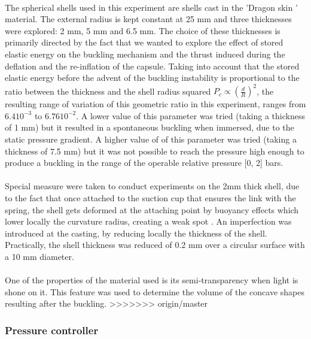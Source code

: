 \paragraph{}
The spherical shells used in this experiment are shells cast in the 'Dragon skin ' material. The external radius is kept constant at 25 mm and three thicknesses were explored: 2 mm, 5 mm and 6.5 mm.
The choice of these thicknesses is primarily directed by the fact that we wanted to explore the effect of stored elastic energy on the buckling mechanism and the thrust induced during the deflation and the re-inflation of the capsule. Taking into account that the stored elastic energy before the advent of the buckling instability is proportional to the ratio between the thickness and the shell radius squared \cite{cqpcritic2011} $P_c \propto (\frac{d}{R})^2$, the resulting range of variation of this geometric ratio in this experiment, ranges from $6.4 10^{-3}$ to $6.76 10^{-2}$.
A lower value of this parameter was tried (taking a thickness of 1 mm) but it resulted in a spontaneous buckling when immersed, due to the static pressure gradient.
A higher value of of this parameter was tried (taking a thickness of 7.5 mm) but it was not possible to reach the pressure high enough to produce a buckling in the range of the operable relative pressure [0, 2] bars.
\paragraph{}
Special measure were taken to conduct experiments on the 2mm thick shell, due to the fact that once attached to the suction cup that ensures the link with the spring, the shell gets deformed at the attaching point by buoyancy effects which lower locally the curvature radius, creating a weak spot \cite{cqpcritic2011}. An imperfection was introduced at the casting, by reducing locally the thickness of the shell. Practically, the shell thickness was reduced of 0.2 mm over a circular surface with a 10 mm diameter.
\paragraph{}
One of the properties of the material used is its semi-transparency when light is shone on it. This feature was used to determine the volume of the concave shapes resulting after the buckling.
>>>>>>> origin/master

\subsubsection{Pressure controller}
\label{sssection:pressure_controller}

